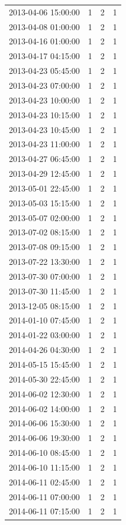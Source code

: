 \begin{tabular}{lrrr}
2013-04-06 15:00:00 & 1 & 2 & 1 \\
2013-04-08 01:00:00 & 1 & 2 & 1 \\
2013-04-16 01:00:00 & 1 & 2 & 1 \\
2013-04-17 04:15:00 & 1 & 2 & 1 \\
2013-04-23 05:45:00 & 1 & 2 & 1 \\
2013-04-23 07:00:00 & 1 & 2 & 1 \\
2013-04-23 10:00:00 & 1 & 2 & 1 \\
2013-04-23 10:15:00 & 1 & 2 & 1 \\
2013-04-23 10:45:00 & 1 & 2 & 1 \\
2013-04-23 11:00:00 & 1 & 2 & 1 \\
2013-04-27 06:45:00 & 1 & 2 & 1 \\
2013-04-29 12:45:00 & 1 & 2 & 1 \\
2013-05-01 22:45:00 & 1 & 2 & 1 \\
2013-05-03 15:15:00 & 1 & 2 & 1 \\
2013-05-07 02:00:00 & 1 & 2 & 1 \\
2013-07-02 08:15:00 & 1 & 2 & 1 \\
2013-07-08 09:15:00 & 1 & 2 & 1 \\
2013-07-22 13:30:00 & 1 & 2 & 1 \\
2013-07-30 07:00:00 & 1 & 2 & 1 \\
2013-07-30 11:45:00 & 1 & 2 & 1 \\
2013-12-05 08:15:00 & 1 & 2 & 1 \\
2014-01-10 07:45:00 & 1 & 2 & 1 \\
2014-01-22 03:00:00 & 1 & 2 & 1 \\
2014-04-26 04:30:00 & 1 & 2 & 1 \\
2014-05-15 15:45:00 & 1 & 2 & 1 \\
2014-05-30 22:45:00 & 1 & 2 & 1 \\
2014-06-02 12:30:00 & 1 & 2 & 1 \\
2014-06-02 14:00:00 & 1 & 2 & 1 \\
2014-06-06 15:30:00 & 1 & 2 & 1 \\
2014-06-06 19:30:00 & 1 & 2 & 1 \\
2014-06-10 08:45:00 & 1 & 2 & 1 \\
2014-06-10 11:15:00 & 1 & 2 & 1 \\
2014-06-11 02:45:00 & 1 & 2 & 1 \\
2014-06-11 07:00:00 & 1 & 2 & 1 \\
2014-06-11 07:15:00 & 1 & 2 & 1 \\

\end{tabular}
